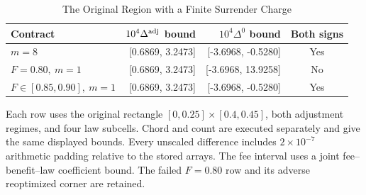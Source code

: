 \begin{table}[tbp]
\centering\small
\caption{The Original Region with a Finite Surrender Charge}
\label{tab:r9_fee_certificate}
\begin{tabular}{lrrc}
\toprule
Contract & $10^4\Delta^{\rm adj}$ bound & $10^4\Delta^0$ bound & Both signs \\
\midrule
$m=8$ & [0.6869, 3.2473] & [-3.6968, -0.5280] & Yes \\
$F=0.80,\ m=1$ & [0.6869, 3.2473] & [-3.6968, 13.9258] & No \\
$F\in[0.85,0.90],\ m=1$ & [0.6869, 3.2473] & [-3.6968, -0.5280] & Yes \\
\bottomrule
\end{tabular}
\begin{minipage}{0.98\textwidth}\footnotesize\medskip
Each row uses the original rectangle $[0,0.25]\times[0.4,0.45]$, both adjustment regimes, and four law subcells. Chord and count are executed separately and give the same displayed bounds. Every unscaled difference includes $2\times10^{-7}$ arithmetic padding relative to the stored arrays. The fee interval uses a joint fee--benefit--law coefficient bound. The failed $F=0.80$ row and its adverse reoptimized corner are retained.
\end{minipage}
\end{table}
